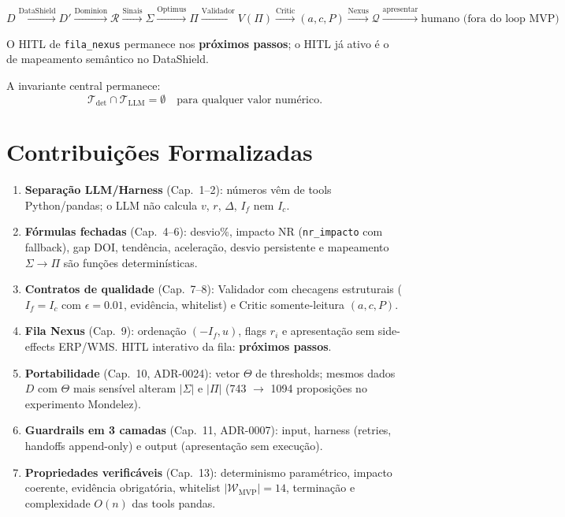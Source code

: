 \documentclass[a4paper, 12pt]{report}
\theoremstyle{definition}
\theoremstyle{remark}
\newcommand{\fila}{\mathcal{Q}}
\begin{document}
\[
  D
  \xrightarrow{\text{DataShield}}
  D'
  \xrightarrow{\text{Dominion}}
  \mathcal{R}
  \xrightarrow{\text{Sinais}}
  \Sigma
  \xrightarrow{\text{Optimus}}
  \Pi
  \xrightarrow{\text{Validador}}
  V(\Pi)
  \xrightarrow{\text{Critic}}
  (a,c,P)
  \xrightarrow{\text{Nexus}}
  \fila
  \xrightarrow{\text{apresentar}}
  \text{humano (fora do loop MVP)}
\]

O HITL de \texttt{fila\_nexus} permanece nos \textbf{pr\'oximos passos};
o HITL j\'a ativo \'e o de mapeamento sem\^antico no DataShield.

A invariante central permanece:
\[
  \mathcal{T}_{\text{det}} \cap \mathcal{T}_{\text{LLM}} = \emptyset
  \quad\text{para qualquer valor num\'erico.}
\]


\section{Contribui\c{c}\~oes Formalizadas}

\begin{enumerate}
  \item \textbf{Separa\c{c}\~ao LLM/Harness} (Cap.~1--2):
    n\'umeros v\^em de tools Python/pandas; o LLM n\~ao calcula
    $v$, $r$, $\Delta$, $I_f$ nem $I_c$.

  \item \textbf{F\'ormulas fechadas} (Cap.~4--6):
    desvio\%, impacto NR (\texttt{nr\_impacto} com fallback),
    gap DOI, tend\^encia, acelera\c{c}\~ao, desvio persistente e
    mapeamento $\Sigma \to \Pi$ s\~ao fun\c{c}\~oes determin\'isticas.

  \item \textbf{Contratos de qualidade} (Cap.~7--8):
    Validador com checagens estruturais ($I_f = I_c$ com
    $\epsilon = 0.01$, evid\^encia, whitelist) e Critic
    somente-leitura $(a, c, P)$.

  \item \textbf{Fila Nexus} (Cap.~9):
    ordena\c{c}\~ao $(-I_f, u)$, flags $r_i$ e apresenta\c{c}\~ao
    sem side-effects ERP/WMS. HITL interativo da fila:
    \textbf{pr\'oximos passos}.

  \item \textbf{Portabilidade} (Cap.~10, ADR-0024):
    vetor $\Theta$ de thresholds; mesmos dados $D$ com $\Theta$
    mais sens\'ivel alteram $|\Sigma|$ e $|\Pi|$
    (743 $\to$ 1094 proposi\c{c}\~oes no experimento Mondelez).

  \item \textbf{Guardrails em 3 camadas} (Cap.~11, ADR-0007):
    input, harness (retries, handoffs append-only) e output
    (apresenta\c{c}\~ao sem execu\c{c}\~ao).

  \item \textbf{Propriedades verific\'aveis} (Cap.~13):
    determinismo param\'etrico, impacto coerente, evid\^encia
    obrigat\'oria, whitelist $|\mathcal{W}_{\text{MVP}}|=14$,
    termina\c{c}\~ao e complexidade $O(n)$ das tools pandas.
\end{enumerate}
\end{document}
